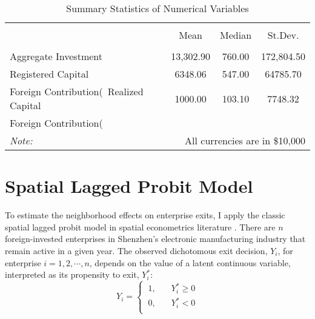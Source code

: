 \begin{table}[!htbp] \centering
  \caption{Summary Statistics of Numerical Variables}
  \begin{tabular}{lccc}
    \\[-1.8ex]\hline \hline \\[-1.8ex]
    & \multicolumn{1}{c}{Mean} & \multicolumn{1}{c}{Median} & \multicolumn{1}{c}{St.Dev.} \\
    \hline \\ [-1.8ex]
    Aggregate Investment & 13,302.90 & 760.00 & 172,804.50 \\
    Registered Capital & 6348.06 & 547.00 & 64785.70 \\
    Foreign Contribution(\    Realized Capital & 1000.00 & 103.10 & 7748.32 \\
    Foreign Contribution(\    \hline \hline \\[-1.8ex]
    \textit{Note:}  & \multicolumn{3}{r}{All currencies are in \$10,000} \\
  \end{tabular}
\end{table}

\section{Spatial Lagged Probit Model}

To estimate the neighborhood effects on enterprise exits, I apply the classic spatial lagged probit model in spatial econometrics literature \cite{anselin1988spatial, anselin2013advances, lesage2009introduction}. There are $n$ foreign-invested enterprises in Shenzhen's electronic manufacturing industry that remain active in a given year. The observed dichotomous exit decision, $Y_i$, for enterprise $i=1,2,\cdots,n$, depends on the value of a latent continuous variable, interpreted as its propensity to exit, $Y_i^*$:
\begin{equation}
  \nonumber
  Y_i = \left \{ \
  \begin{aligned}
    1, & \quad Y_i^* \geq 0 \\
    0, & \quad Y_i^* < 0 \\
  \end{aligned} \right.
\end{equation}

